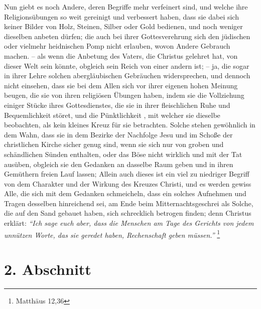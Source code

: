 Nun giebt es noch Andere, deren Begriffe mehr
verfeinert sind, und welche ihre
Religionsübungen so weit
gereinigt und verbessert haben, dass sie dabei sich keiner Bilder von Holz,
Steinen, Silber oder Gold bedienen,
und noch weniger dieselben anbeten dürfen; die auch bei ihrer Gottesverehrung
sich den jüdischen  oder vielmehr heidnischen Pomp nicht
erlauben, wovon Andere
Gebrauch
machen.  -- als wenn die Anbetung des Vaters, die Christus
gelehret hat, von
dieser Welt sein könnte, obgleich sein Reich von einer andern ist; -- ja, die
sogar in ihrer Lehre solchen abergläubischen Gebräuchen widersprechen, und
dennoch nicht einsehen, dass sie bei dem Allen sich vor ihrer eigenen hohen
Meinung beugen, die sie von ihren religiösen Übungen haben, indem sie die
Vollziehung einiger Stücke ihres Gottesdienstes, die sie in ihrer fleischlichen
Ruhe und Bequemlichkeit störet, und die Pünktlichkeit , mit
welcher sie dieselbe
beobachten, als
kein kleines Kreuz für sie betrachten. Solche stehen
gewöhnlich in dem Wahn,
dass sie in dem Bezirke der Nachfolge Jesu und im Schoße der christlichen
Kirche sicher genug sind, wenn sie sich nur von groben und schändlichen Sünden
enthalten,   oder das Böse
nicht wirklich und mit der Tat ausüben, obgleich sie
den Gedanken an dasselbe Raum geben und in ihren Gemüthern freien Lauf lassen;
Allein auch dieses ist ein viel zu niedriger Begriff von dem Charakter und der
Wirkung des Kreuzes Christi, und es werden gewiss Alle, die sich mit dem
Gedanken schmeicheln, dass ein solches Aufnehmen und Tragen desselben
hinreichend sei,  am Ende beim Mitternachtsgeschrei als
Solche, die auf den Sand
gebauet haben, sich schrecklich betrogen finden; denn Christus erklärt:
\textit{"`Ich sage euch aber, dass die Menschen am Tage des Gerichts von jedem
unnützen Worte, das sie geredet haben, Rechenschaft geben müssen."'}
\footnote{Matthäus 12,36}

\section{2. Abschnitt} \label{kap6_ab2}


